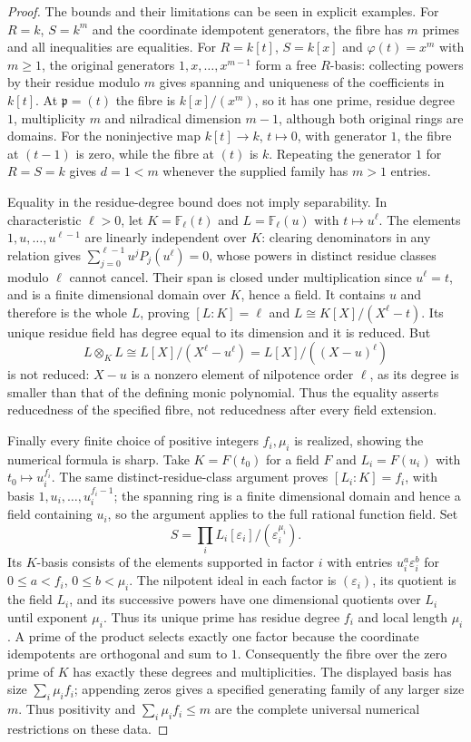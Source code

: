 \begin{proof}
The bounds and their limitations can be seen in explicit examples.
For $R=k$, $S=k^m$ and the coordinate idempotent generators,
the fibre has $m$ primes and all inequalities are equalities.
For $R=k[t]$, $S=k[x]$ and $\varphi(t)=x^m$ with $m\geq1$,
the original generators $1,x,\ldots,x^{m-1}$ form a free
$R$-basis: collecting powers by their residue modulo $m$ gives
spanning and uniqueness of the coefficients in $k[t]$.
At $\mathfrak p=(t)$ the fibre is $k[x]/(x^m)$, so it has
one prime, residue degree $1$, multiplicity $m$ and nilradical
dimension $m-1$, although both original rings are domains.
For the noninjective map $k[t]\to k$, $t\mapsto0$, with generator
$1$, the fibre at $(t-1)$ is zero, while the fibre at $(t)$ is $k$.
Repeating the generator $1$ for $R=S=k$ gives $d=1<m$ whenever
the supplied family has $m>1$ entries.

Equality in the residue-degree bound does not imply separability.
In characteristic $\ell>0$, let $K=\mathbb F_\ell(t)$ and
$L=\mathbb F_\ell(u)$ with $t\mapsto u^\ell$.
The elements $1,u,\ldots,u^{\ell-1}$ are linearly independent
over $K$: clearing denominators in any relation gives
$\sum_{j=0}^{\ell-1}u^jP_j(u^\ell)=0$, whose powers in distinct
residue classes modulo $\ell$ cannot cancel. Their span is closed
under multiplication since $u^\ell=t$, and is a finite dimensional
domain over $K$, hence a field. It contains $u$ and therefore is
the whole $L$, proving $[L:K]=\ell$ and
$L\cong K[X]/(X^\ell-t)$. Its unique residue field has degree
equal to its dimension and it is reduced. But
$$
L\otimes_KL\cong L[X]/(X^\ell-u^\ell)
=L[X]/((X-u)^\ell)
$$
is not reduced: $X-u$ is a nonzero element of nilpotence order
$\ell$, as its degree is smaller than that of the defining monic
polynomial. Thus the equality asserts reducedness of the specified
fibre, not reducedness after every field extension.

Finally every finite choice of positive integers $f_i,\mu_i$
is realized, showing the numerical formula is sharp. Take
$K=F(t_0)$ for a field $F$ and
$L_i=F(u_i)$ with $t_0\mapsto u_i^{f_i}$.
The same distinct-residue-class argument proves
$[L_i:K]=f_i$, with basis $1,u_i,\ldots,u_i^{f_i-1}$;
the spanning ring is a finite dimensional domain and hence a field
containing $u_i$, so the argument applies to the full rational
function field. Set
$$
S=\prod_i L_i[\varepsilon_i]/(\varepsilon_i^{\mu_i}).
$$
Its $K$-basis consists of the elements supported in factor $i$
with entries $u_i^a\varepsilon_i^b$ for
$0\leq a<f_i$, $0\leq b<\mu_i$. The nilpotent ideal in each
factor is $(\varepsilon_i)$, its quotient is the field $L_i$,
and its successive powers have one dimensional quotients over
$L_i$ until exponent $\mu_i$. Thus its unique prime has residue
degree $f_i$ and local length $\mu_i$. A prime of the product
selects exactly one factor because the coordinate idempotents
are orthogonal and sum to $1$. Consequently the fibre over the
zero prime of $K$ has exactly these degrees and multiplicities.
The displayed basis has size $\sum_i\mu_if_i$; appending zeros
gives a specified generating family of any larger size $m$.
Thus positivity and $\sum_i\mu_if_i\leq m$ are the complete
universal numerical restrictions on these data.
\end{proof}